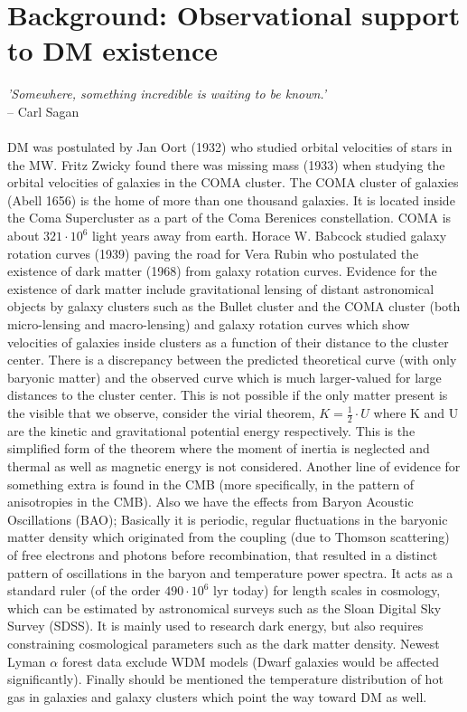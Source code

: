 \section{Background: Observational support to DM existence}
\textit{'Somewhere, something incredible is waiting to be known.'} \\
-- Carl Sagan \\ \\

DM was postulated by Jan Oort (1932) who studied orbital velocities of stars in the MW. Fritz Zwicky found there was missing mass (1933) when studying the orbital velocities of galaxies in the COMA cluster. The COMA cluster of galaxies (Abell 1656) is the home of more than one thousand galaxies. It is located inside the Coma Supercluster as a part of the Coma Berenices constellation. COMA is about $321 \cdot 10^6 $ light years away from earth. Horace W. Babcock studied galaxy rotation curves (1939) paving the road for Vera Rubin who postulated the existence of dark matter (1968) from galaxy rotation curves. Evidence for the existence of dark matter include gravitational lensing of distant astronomical objects by galaxy clusters such as the Bullet cluster and the COMA cluster (both micro-lensing and macro-lensing) and galaxy rotation curves which show velocities of galaxies inside clusters as a function of their distance to the cluster center. There is a discrepancy between the predicted theoretical curve (with only baryonic matter) and the observed curve which is much larger-valued for large distances to the cluster center. This is not possible if the only matter present is the visible that we observe, consider the virial theorem, $ K = \frac{1}{2} \cdot U $ where K and U are the kinetic and gravitational potential energy respectively. This is the simplified form of the theorem where the moment of inertia is neglected and thermal as well as magnetic energy is not considered. Another line of evidence for something extra is found in the CMB (more specifically, in the pattern of anisotropies in the CMB). Also we have the effects from Baryon Acoustic Oscillations (BAO); Basically it is periodic, regular fluctuations in the baryonic matter density which originated from the coupling (due to Thomson scattering) of free electrons and photons before recombination, that resulted in a distinct pattern of oscillations in the baryon and temperature power spectra. It acts as a standard ruler (of the order $490\cdot 10^6 $ lyr today) for length scales in cosmology, which can be estimated by astronomical surveys such as the Sloan Digital Sky Survey (SDSS). It is mainly used to research dark energy, but also requires constraining cosmological parameters such as the dark matter density. Newest Lyman $\alpha$ forest data exclude WDM models (Dwarf galaxies would be affected significantly). Finally should be mentioned the temperature distribution of hot gas in galaxies and galaxy clusters which point the way toward DM as well.